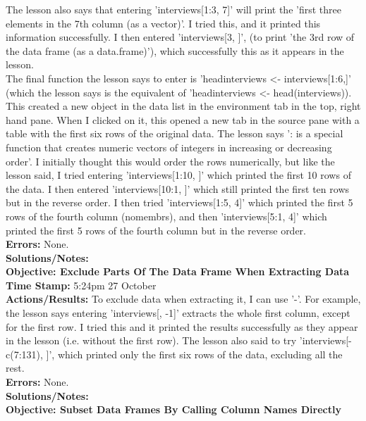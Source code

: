 \documentclass{article}
\begin{document}
\begin{FlushLeft}
The lesson also says that entering 'interviews[1:3, 7]' will print the 'first three elements in the 7th column (as a vector)'. I tried this, and it printed this information successfully. I then entered 'interviews[3, ]', (to print 'the 3rd row of the data frame (as a data.frame)'), which successfully this as it appears in the lesson.\\
The final function the lesson says to enter is 'head\textunderscore interviews \textless - interviews[1:6,]' (which the lesson says is the equivalent of 'head\textunderscore interviews \textless - head(interviews)). This created a new object in the data list in the environment tab in the top, right hand pane. When I clicked on it, this opened a new tab in the source pane with a table with the first six rows of the original data. The lesson says ': is a special function that creates numeric vectors of integers in increasing or decreasing order'. I initially thought this would order the rows numerically, but like the lesson said, I tried entering 'interviews[1:10, ]' which printed the first 10 rows of the data. I then entered 'interviews[10:1, ]' which still printed the first ten rows but in the reverse order. I then tried 'interviews[1:5, 4]' which printed the first 5 rows of the fourth column (no\textunderscore membrs), and then 'interviews[5:1, 4]' which printed the first 5 rows of the fourth column but in the reverse order.\\
\textbf{Errors:} None.\\
\textbf{Solutions/Notes:}\\
\vspace{5mm}
\textbf{Objective: Exclude Parts Of The Data Frame When Extracting Data}\\ 
\textbf{Time Stamp:} 5:24pm 27 October\\
\textbf{Actions/Results:} To exclude data when extracting it, I can use '-'. For example, the lesson says entering 'interviews[, -1]' extracts the whole first column, except for the first row. I tried this and it printed the results successfully as they appear in the lesson (i.e. without the first row). The lesson also said to try 'interviews[-c(7:131), ]', which printed only the first six rows of the data, excluding all the rest.\\
\textbf{Errors:} None.\\
\textbf{Solutions/Notes:}\\
\vspace{5mm}
\textbf{Objective: Subset Data Frames By Calling Column Names Directly}\\ 

\end{FlushLeft}
\end{document}
